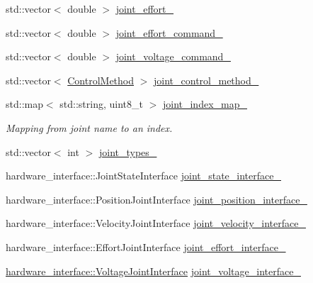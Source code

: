 \begin{DoxyCompactItemize}
\item 
std\+::vector$<$ double $>$ \hyperlink{classuwrt_1_1arm_1_1_arm_h_w_aed887286b800a8852217146876a9bb6b}{joint\+\_\+effort\+\_\+}
\item 
std\+::vector$<$ double $>$ \hyperlink{classuwrt_1_1arm_1_1_arm_h_w_a9e0792faa7682cd234cfa518e976e79c}{joint\+\_\+effort\+\_\+command\+\_\+}
\item 
std\+::vector$<$ double $>$ \hyperlink{classuwrt_1_1arm_1_1_arm_h_w_acaa46956d8f97421c96c9b5a9b51200f}{joint\+\_\+voltage\+\_\+command\+\_\+}
\item 
std\+::vector$<$ \hyperlink{classuwrt_1_1arm_1_1_arm_h_w_aef42f10e04f7f426b3d06f91d0897b6b}{Control\+Method} $>$ \hyperlink{classuwrt_1_1arm_1_1_arm_h_w_ad19ee0c5fe04b8e8366f036010927fc4}{joint\+\_\+control\+\_\+method\+\_\+}
\item 
std\+::map$<$ std\+::string, uint8\+\_\+t $>$ \hyperlink{classuwrt_1_1arm_1_1_arm_h_w_afec1b4685b242f4d7e821f6e6c479302}{joint\+\_\+index\+\_\+map\+\_\+}
\begin{DoxyCompactList}\small\item\em Mapping from joint name to an index. \end{DoxyCompactList}\item 
std\+::vector$<$ int $>$ \hyperlink{classuwrt_1_1arm_1_1_arm_h_w_a69c250992873f9451b2d0e45fb1fc41e}{joint\+\_\+types\+\_\+}
\item 
hardware\+\_\+interface\+::\+Joint\+State\+Interface \hyperlink{classuwrt_1_1arm_1_1_arm_h_w_af7b1df1eb7f6e3badcc369be49af7978}{joint\+\_\+state\+\_\+interface\+\_\+}
\item 
hardware\+\_\+interface\+::\+Position\+Joint\+Interface \hyperlink{classuwrt_1_1arm_1_1_arm_h_w_ac0e4f2bbeaac8437cafa891602a7e0a0}{joint\+\_\+position\+\_\+interface\+\_\+}
\item 
hardware\+\_\+interface\+::\+Velocity\+Joint\+Interface \hyperlink{classuwrt_1_1arm_1_1_arm_h_w_af0a297190b6a67aee4f86fb7f44c36d2}{joint\+\_\+velocity\+\_\+interface\+\_\+}
\item 
hardware\+\_\+interface\+::\+Effort\+Joint\+Interface \hyperlink{classuwrt_1_1arm_1_1_arm_h_w_a5d2464c0da77d58da43af0baa5d7c2a4}{joint\+\_\+effort\+\_\+interface\+\_\+}
\item 
\hyperlink{classhardware__interface_1_1_voltage_joint_interface}{hardware\+\_\+interface\+::\+Voltage\+Joint\+Interface} \hyperlink{classuwrt_1_1arm_1_1_arm_h_w_aec35c81c5c9a7f32fe38ea3cdfbb8b6d}{joint\+\_\+voltage\+\_\+interface\+\_\+}
\item 

\end{DoxyCompactItemize}
